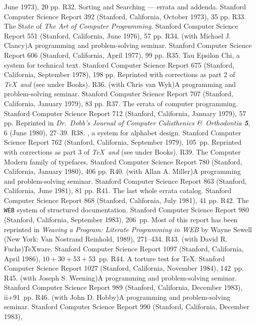  June 1973), 20 pp.  
\p R32.  Sorting and Searching --- errata and addenda.  Stanford Computer
 Science Report 392 (Stanford, California, October 1973), 35 pp.  
\p R33.  The State of {\sl The Art of Computer Programming}.  
 Stanford Computer Science Report 551 (Stanford, California,
 June 1976), 57 pp.  
\p *R34.  (with Michael J. Clancy)\xskip A programming and
 problem-solving seminar.  Stanford Computer Science Report 606
 (Stanford, California, April 1977), 99 pp.
\p R35.  Tau Epsilon Chi, a system for technical text.  Stanford Computer
 Science Report 675 (Stanford, California, September 1978), 198 pp.
 Reprinted with corrections as part 2 of {\sl \TeX\ and \slMF\/}
 (see under Books).
\p *R36.  (with Chris van Wyk)\xskip A programming and problem-solving
 seminar.  Stanford Computer Science Report 707 (Stanford, California,
 January 1979), 83 pp.
\p R37.  The errata of computer programming.  Stanford Computer Science
 Report 712 (Stanford, California, January 1979), 57 pp. Reprinted in
 {\sl Dr.~Dobb's Journal of Computer Calisthenics \&\ Orthodontia\/ \bf 5},\,6
 (June 1980), 27--39.
\p R38.  \MF, a system for alphabet design.  Stanford Computer Science
 Report 762 (Stanford, California, September 1979), 105~pp.  Reprinted with
 corrections as part 3 of {\sl \TeX\ and \slMF\/} (see under Books).
\p R39.  The Computer Modern family of typefaces.  Stanford Computer Science
 Report 780 (Stanford, California, January 1980), 406 pp.
\p *R40. (with Allan A. Miller)\xskip A programming and
 problem-solving seminar. Stanford Computer Science Report 863
 (Stanford, California, June 1981), 81 pp.
\p R41. The last whole errata catalog. Stanford Computer Science Report 868
 (Stanford, California, July 1981), 41 pp.
\p R42. The {\tt WEB} system of structured documentation. Stanford Computer
 Science Report 980 (Stanford, California, September 1983), 206~pp. Most of
 this report has been reprinted in {\sl Weaving a Program: Literate
 Programming in {\sltt WEB}\/} by Wayne Sewell (New York: Van Nostrand
 Reinhold, 1989), 271--434.
\p R43. (with David R. Fuchs)\xskip \TeX ware. Stanford Computer Science
 Report 1097 (Stanford, California, April 1986), $10+30+53+53$~pp.
\p R44. A torture test for \TeX. Stanford Computer Science Report 1027
 (Stanford, California, November 1984), 142~pp.
\p *R45. (with Joseph S. Weening)\xskip A programming and problem-solving
 seminar. Stanford Computer Science Report 989 (Stanford, California,
 December 1983), ii+91~pp.
\p *R46. (with John D. Hobby)\xskip A programming and problem-solving seminar.
 Stanford Computer Science Report 990 (Stanford, California, December 1983),
